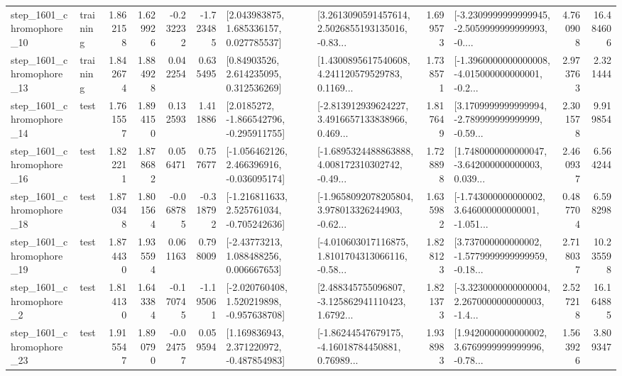 \begin{tabular}{llrrrrllrlrr}
 step\_1601\_chromophore\_10 &  training &      1.862158 &    1.629926 &     -0.232232 & -1.723485 &     [2.043983875, 1.685336157, 0.027785537] &  [3.2613090591457614, 2.5026855193135016, -0.83... &       1.699573 &  [-3.2309999999999945, -2.5059999999999993, -0.... &            4.760908 &         16.484606 \\
 step\_1601\_chromophore\_13 &  training &      1.842674 &    1.884928 &      0.042254 &  0.635495 &      [0.84903526, 2.614235095, 0.312536269] &  [1.4300895617540608, 4.241120579529783, 0.1169... &       1.738571 &  [-1.3960000000000008, -4.015000000000001, -0.2... &            2.973763 &          2.321444 \\
 step\_1601\_chromophore\_14 &      test &      1.761557 &    1.894150 &      0.132593 &  1.411886 &     [2.0185272, -1.866542796, -0.295911755] &  [-2.813912939624227, 3.4916657133838966, 0.469... &       1.817649 &  [3.1709999999999994, -2.789999999999999, -0.59... &            2.301578 &          9.919854 \\
 step\_1601\_chromophore\_16 &      test &      1.822211 &    1.878682 &      0.056471 &  0.757677 &   [-1.056462126, 2.466396916, -0.036095174] &  [-1.6895324488863888, 4.008172310302742, -0.49... &       1.728898 &  [1.7480000000000047, -3.642000000000003, 0.039... &            2.460937 &          6.564244 \\
 step\_1601\_chromophore\_18 &      test &      1.870348 &    1.801564 &     -0.068785 & -0.318792 &   [-1.216811633, 2.525761034, -0.705242636] &  [-1.9658092078205804, 3.978013326244903, -0.62... &       1.635982 &  [-1.743000000000002, 3.646000000000001, -1.051... &            0.487704 &          6.598298 \\
 step\_1601\_chromophore\_19 &      test &      1.874430 &    1.935594 &      0.061163 &  0.798009 &     [-2.43773213, 1.088488256, 0.006667653] &  [-4.010603017116875, 1.8101704313066116, -0.58... &       1.828123 &  [3.737000000000002, -1.5779999999999959, -0.18... &            2.718037 &         10.235598 \\
  step\_1601\_chromophore\_2 &      test &      1.814130 &    1.643384 &     -0.170745 & -1.195061 &   [-2.020760408, 1.520219898, -0.957638708] &  [2.488345755096807, -3.125862941110423, 1.6792... &       1.821373 &  [-3.3230000000000004, 2.2670000000000003, -1.4... &            2.527218 &         16.164885 \\
 step\_1601\_chromophore\_23 &      test &      1.915547 &    1.890790 &     -0.024757 &  0.059594 &    [1.169836943, 2.371220972, -0.487854983] &  [-1.86244547679175, -4.16018784450881, 0.76989... &       1.938983 &  [1.9420000000000002, 3.6769999999999996, -0.78... &            1.563926 &          3.809347 \\

\end{tabular}
